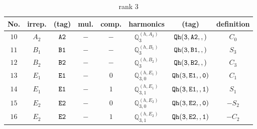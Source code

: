 \documentclass[fleqn,8pt]{jsarticle}
\begin{document}
\begin{table}[ht!]
\begin{center}
\caption{rank 3}
\renewcommand{\arraystretch}{1.3}
\begin{tabular}{cccccccc} \hline \hline
No. & irrep. & (tag) & mul. & comp. & harmonics & (tag) & definition \\ \hline
$ 10 $ & $ A_{2} $ & $ {\tt A2} $ & $ - $ & $ - $ & $ \mathbb{Q}_{3}^{(h,A_{2})} $ & $ {\tt Qh(3,A2,,)} $ & $ C_{0} $ \\
$ 11 $ & $ B_{1} $ & $ {\tt B1} $ & $ - $ & $ - $ & $ \mathbb{Q}_{3}^{(h,B_{1})} $ & $ {\tt Qh(3,B1,,)} $ & $ S_{3} $ \\
$ 12 $ & $ B_{2} $ & $ {\tt B2} $ & $ - $ & $ - $ & $ \mathbb{Q}_{3}^{(h,B_{2})} $ & $ {\tt Qh(3,B2,,)} $ & $ C_{3} $ \\
$ 13 $ & $ E_{1} $ & $ {\tt E1} $ & $ - $ & $ 0 $ & $ \mathbb{Q}_{3,0}^{(h,E_{1})} $ & $ {\tt Qh(3,E1,,0)} $ & $ C_{1} $ \\
$ 14 $ & $ E_{1} $ & $ {\tt E1} $ & $ - $ & $ 1 $ & $ \mathbb{Q}_{3,1}^{(h,E_{1})} $ & $ {\tt Qh(3,E1,,1)} $ & $ S_{1} $ \\
$ 15 $ & $ E_{2} $ & $ {\tt E2} $ & $ - $ & $ 0 $ & $ \mathbb{Q}_{3,0}^{(h,E_{2})} $ & $ {\tt Qh(3,E2,,0)} $ & $ - S_{2} $ \\
$ 16 $ & $ E_{2} $ & $ {\tt E2} $ & $ - $ & $ 1 $ & $ \mathbb{Q}_{3,1}^{(h,E_{2})} $ & $ {\tt Qh(3,E2,,1)} $ & $ - C_{2} $ \\
 \hline \hline
\end{tabular}
\end{center}
\end{table}
\end{document}
